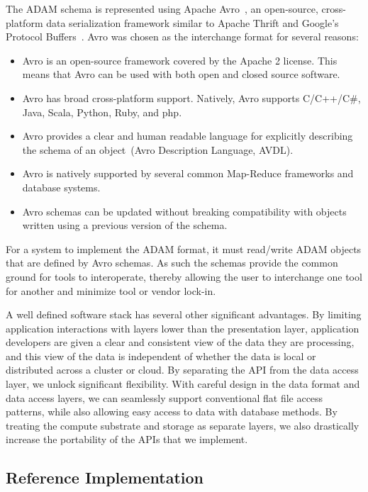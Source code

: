 \documentclass{bioinfo}
\begin{document}
The ADAM schema is represented using Apache Avro~\citep{avro}, an open-source, cross-platform data serialization framework similar
to Apache Thrift and Google's Protocol Buffers~\citep{thrift, protobuf}. Avro was chosen as the interchange format for several reasons:

\begin{itemize}
\item Avro is an open-source framework covered by the Apache 2 license. This means that Avro can be used with both open and closed source software.
\item Avro has broad cross-platform support. Natively, Avro supports C/C++/C\#, Java, Scala, Python, Ruby, and php.
\item Avro provides a clear and human readable language for explicitly describing the schema of an object~(Avro Description Language, AVDL).
\item Avro is natively supported by several common Map-Reduce frameworks and database systems.
\item Avro schemas can be updated without breaking compatibility with objects written using a previous version of the schema.
\end{itemize}

For a system to implement the ADAM format, it must read/write ADAM objects that are defined by Avro schemas. As such the schemas
provide the common ground for tools to interoperate, thereby allowing the user to interchange one tool for another and minimize
tool or vendor lock-in.

A well defined software stack has several other significant advantages. By limiting application interactions with layers lower than the presentation layer,
application developers are given a clear and consistent view of the data they are processing, and this view of the data is independent of whether the data
is local or distributed across a cluster or cloud. By separating the API from the data access layer, we unlock significant flexibility. With careful design in the data
format and data access layers, we can seamlessly support conventional flat file access patterns, while also allowing easy access to data with database methods.
By treating the compute substrate and storage as separate layers, we also drastically increase the portability of the APIs that we implement.

\subsection{Reference Implementation}
\label{sec:reference-implementation}
\end{document}
